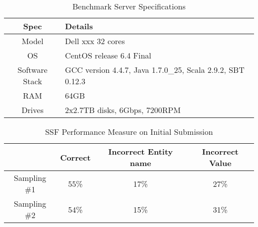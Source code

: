 \begin{table}
\caption{Benchmark Server Specifications }
\centering
\label{table:serverspec}
\begin{tabular}{|c|l|}
\hline 
\textbf{Spec} & \textbf{Details} \\ \hline
Model & Dell xxx 32 cores \\ \hline 
OS & CentOS release 6.4 Final \\ \hline 
Software Stack & GCC version 4.4.7, Java 1.7.0\_25, Scala 2.9.2, SBT 0.12.3 \\ \hline 
 RAM & 64GB\\ \hline 
 Drives & 2x2.7TB disks, 6Gbps, 7200RPM\\ \hline 
\end{tabular} 
\end{table}







\begin{table}
\caption{SSF Performance Measure on Initial Submission }
\centering
\label{table:initialresult}

\begin{tabular}{|c|c|c|c|}
\hline 
 & \textbf{Correct} & \textbf{Incorrect Entity name} & \textbf{Incorrect Value} \\ 
\hline 
Sampling \#1 & 55\% & 17\% & 27\% \\ 
\hline Sampling \#2 & 54\% & 15\% & 31\%  \\ 
\hline 
\end{tabular} 
\end{table}






